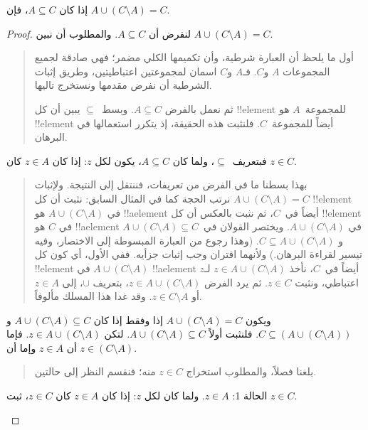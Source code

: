 \documentclass[../../../include/open-logic-section]{subfiles}
\begin{document}


\begin{prop}
إذا كان $A \subseteq C$، فإن $A \cup (C \setminus A) = C$.
\end{prop}

\begin{proof}
  لنفرض أن $A \subseteq C$. والمطلوب أن نبين
  $A \cup (C \setminus A) = C$.
  \begin{quote}
    أول ما يلحظ أن العبارة شرطية، وأن تكميمها الكلي مضمر؛ فهي صادقة
    لجميع المجموعات $A$ و$C$. فـ$A$ و$C$ اسمان لمجموعتين اعتباطيتين،
    وطريق إثبات الشرطية أن نفرض مقدمها ونستخرج تاليها.

    ثم نعمل بالفرض $A \subseteq C$. وبسط~$\subseteq$ يبين أن كل
    !!{element} للمجموعة~$A$ هو !!{element} أيضاً للمجموعة~$C$.
    فلنثبت هذه الحقيقة، إذ يتكرر استعمالها في البرهان.
  \end{quote}
  فبتعريف~$\subseteq$، ولما كان $A \subseteq C$، يكون لكل $z$: إذا
  كان $z \in A$ كان $z \in C$.
  \begin{quote}
    بهذا بسطنا ما في الفرض من تعريفات، فننتقل إلى النتيجة. ولإثبات
    $A \cup (C \setminus A) = C$ نرتب الحجة كما في المثال السابق:
    نثبت أن كل !!{element} في $A \cup (C \setminus A)$ هو
    !!a{element} أيضاً في~$C$، ثم نثبت بالعكس أن كل !!{element} في
    $C$ هو !!a{element} في $A \cup (C \setminus A)$. ويختصر القولان
    في~$A \cup (C \setminus A) \subseteq C$ و
    $C \subseteq A \cup (C \setminus A)$. (وهذا رجوع من العبارة
    المبسوطة إلى الاختصار، وفيه تيسير لقراءة البرهان.) ولأنهما اقتران
    وجب إثبات جزأيه. ففي الأول، أي كون كل !!{element} في
    $A \cup (C \setminus A)$ !!a{element} أيضاً في~$C$، نأخذ
    $z \in A \cup (C \setminus A)$ لـ$z$ اعتباطي، ونثبت
    $z \in C$. ثم يرد الفرض $z \in A \cup (C \setminus A)$، بتعريف
    $\cup$، إلى $z \in A$ أو
    $z \in C \setminus A$. وقد غدا هذا المسلك مألوفاً.
    \end{quote}
  ويكون $A \cup (C \setminus A) = C$ إذا وفقط إذا كان
  $A \cup (C \setminus A) \subseteq C$ و
  $C \subseteq (A \cup (C \setminus A))$. فلنثبت أولاً
  $A \cup (C \setminus A) \subseteq C$. لتكن
  $z \in A \cup (C \setminus A)$. فإما أن $z \in A$ وإما أن
  $z \in (C \setminus A)$.
  \begin{quote}
    بلغنا فصلاً، والمطلوب استخراج $z \in C$ منه؛ فنقسم النظر إلى
    حالتين.
  \end{quote}
  الحالة 1: $z \in A$. ولما كان لكل $z$: إذا كان $z \in A$ كان
  $z \in C$، ثبت $z \in C$.
  \begin{quote}

\end{quote}
\end{proof}
\end{document}

